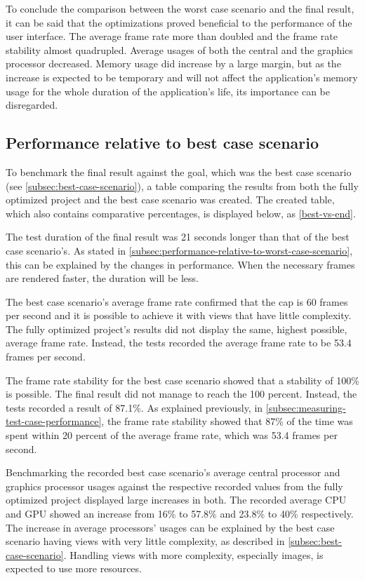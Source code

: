 \documentclass[a4paper,12pt]{article}
\begin{document}
To conclude the comparison between the worst case scenario and the final result, it can be said that the optimizations proved beneficial to the performance of the user interface. The average frame rate more than doubled and the frame rate stability almost quadrupled. Average usages of both the central and the graphics processor decreased. Memory usage did increase by a large margin, but as the increase is expected to be temporary and will not affect the application's memory usage for the whole duration of the application's life, its importance can be disregarded.

\subsection{Performance relative to best case scenario}
To benchmark the final result against the goal, which was the best case scenario (see \autoref{subsec:best-case-scenario}), a table comparing the results from both the fully optimized project and the best case scenario was created. The created table, which also contains comparative percentages, is displayed below, as \autoref{best-vs-end}.

The test duration of the final result was 21 seconds longer than that of the best case scenario's. As stated in \autoref{subsec:performance-relative-to-worst-case-scenario}, this can be explained by the changes in performance. When the necessary frames are rendered faster, the duration will be less.

The best case scenario's average frame rate confirmed that the cap is 60 frames per second and it is possible to achieve it with views that have little complexity. The fully optimized project's results did not display the same, highest possible, average frame rate. Instead, the tests recorded the average frame rate to be 53.4 frames per second.

The frame rate stability for the best case scenario showed that a stability of 100\% is possible. The final result did not manage to reach the 100 percent. Instead, the tests recorded a result of 87.1\%. As explained previously, in \autoref{subsec:measuring-test-case-performance}, the frame rate stability showed that 87\% of the time was spent within 20 percent of the average frame rate, which was 53.4 frames per second.

Benchmarking the recorded best case scenario's average central processor and graphics processor usages against the respective recorded values from the fully optimized project displayed large increases in both. The recorded average CPU and GPU showed an increase from 16\% to 57.8\% and 23.8\% to 40\% respectively. The increase in average processors' usages can be explained by the best case scenario having views with very little complexity, as described in \autoref{subsec:best-case-scenario}. Handling views with more complexity, especially images, is expected to use more resources.
\end{document}
